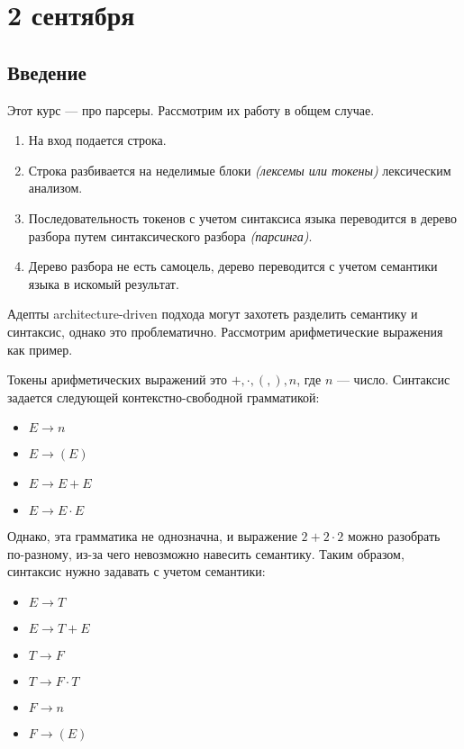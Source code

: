 \chapter{2 сентября}

\section{Введение}

Этот курс --- про парсеры. Рассмотрим их работу в общем случае.

\begin{enumerate}
    \item На вход подается строка.
    \item Строка разбивается на неделимые блоки \textit{(лексемы или токены)} лексическим анализом.
    \item Последовательность токенов с учетом синтаксиса языка переводится в дерево разбора путем синтаксического разбора \textit{(парсинга)}.
    \item Дерево разбора не есть самоцель, дерево переводится с учетом семантики языка в искомый результат.
\end{enumerate}

Адепты architecture-driven подхода могут захотеть разделить семантику и синтаксис, однако это проблематично. Рассмотрим арифметические выражения как пример.

Токены арифметических выражений это \( + , \cdot, (, ), n\), где \(n\) --- число. Синтаксис задается следующей контекстно-свободной грамматикой:
\begin{itemize}
    \item \(E \to n\)
    \item \(E \to (E)\)
    \item \(E \to E + E\)
    \item \(E \to E \cdot E\)
\end{itemize}

Однако, эта грамматика не однозначна, и выражение \(2 + 2 \cdot 2\) можно разобрать по-разному, из-за чего невозможно навесить семантику. Таким образом, синтаксис нужно задавать с учетом семантики:
\begin{itemize}
    \item \(E \to T\)
    \item \(E \to T + E\)
    \item \(T \to F\)
    \item \(T \to F \cdot T\)
    \item \(F \to n\)
    \item \(F \to (E)\)
\end{itemize}

